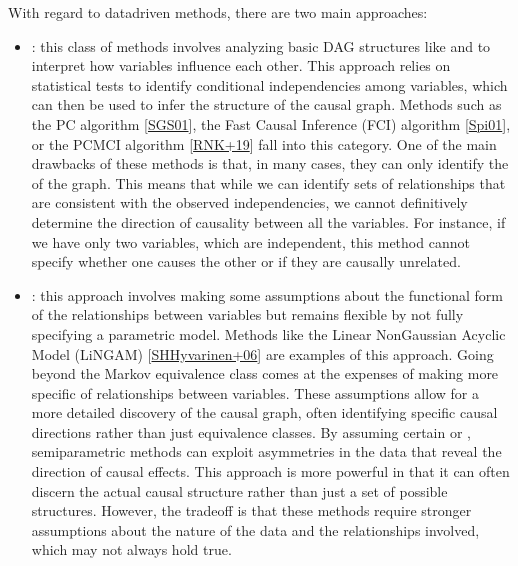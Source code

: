 \documentclass[letterpaper,10pt,english]{jupyterBook}
\begin{document}
\sphinxAtStartPar
With regard to data\sphinxhyphen{}driven methods, there are two main approaches:
\begin{itemize}
\item {} 
\sphinxAtStartPar
{}: this class of methods involves analyzing basic DAG structures like  and  to interpret how variables influence each other. This approach relies on statistical tests to identify conditional independencies among variables, which can then be used to infer the structure of the causal graph. Methods such as the PC algorithm {[}\hyperlink{cite.bibliography:id13}{SGS01}{]}, the Fast Causal Inference (FCI) algorithm {[}\hyperlink{cite.bibliography:id14}{Spi01}{]}, or the PCMCI algorithm {[}\hyperlink{cite.bibliography:id15}{RNK+19}{]} fall into this category. One of the main drawbacks of these methods is that, in many cases, they can only identify the  of the graph. This means that while we can identify sets of relationships that are consistent with the observed independencies, we cannot definitively determine the direction of causality between all the variables. For instance, if we have only two variables, which are independent, this method cannot specify whether one causes the other or if they are causally unrelated.

\item {} 
\sphinxAtStartPar
{}: this approach involves making some assumptions about the functional form of the relationships between variables but remains flexible by not fully specifying a parametric model. Methods like the Linear Non\sphinxhyphen{}Gaussian Acyclic Model (LiNGAM) {[}\hyperlink{cite.bibliography:id4}{SHHyvarinen+06}{]} are examples of this approach. Going beyond the Markov equivalence class comes at the expenses of making more specific  of relationships between variables. These assumptions allow for a more detailed discovery of the causal graph, often identifying specific causal directions rather than just equivalence classes. By assuming certain  or , semi\sphinxhyphen{}parametric methods can exploit asymmetries in the data that reveal the direction of causal effects. This approach is more powerful in that it can often discern the actual causal structure rather than just a set of possible structures. However, the trade\sphinxhyphen{}off is that these methods require stronger assumptions about the nature of the data and the relationships involved, which may not always hold true.

\end{itemize}
\end{document}
